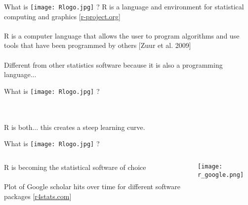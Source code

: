 \documentclass[xcolor=svgnames]{beamer}
\begin{document}
\begin{frame}{What is \texttt{[image: Rlogo.jpg]} \hspace{0.2em}? }
R is a language and environment for statistical computing and graphics
[\href{http://www.r-project.org/}{r-project.org}]\\~\\
R is a computer language that allows the user to program algorithms and use tools that
have been programmed by others [Zuur et al. 2009]\\~\\
Different from other statistics software because it is also a programming language...

\end{frame}

\begin{frame}{What is \texttt{[image: Rlogo.jpg]} \hspace{0.2em}? }

\begin{center}
\\~\\
R is both... this creates a steep learning curve.
\end{center}
\end{frame}


\begin{frame}[t]{What is \texttt{[image: Rlogo.jpg]} \hspace{0.2em}? }
\vspace{-0.1in}
\begin{columns}
\begin{column}{0.4\textwidth}
R is becoming the statistical software of choice\\~\\
Plot of Google scholar hits over time for different software packages
[\href{http://r4stats.com/articles/popularity/}{r4stats.com}]
\end{column}
\begin{column}{0.5\textwidth}
\begin{center}
\texttt{[image: r\_google.png]}
\end{center}
\end{column}
\end{columns}
\end{frame}
\end{document}
